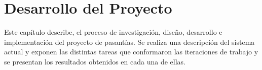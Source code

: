 \chapter{Desarrollo del Proyecto} \label{chap:desarrollo}

\vspace{5 mm}

Este capítulo describe, el proceso de investigación, diseño, desarrollo e implementación del proyecto de pasantías. Se realiza una descripción del sistema actual y exponen las distintas tareas que conformaron las iteraciones de trabajo y se presentan los resultados obtenidos en cada una de ellas.


